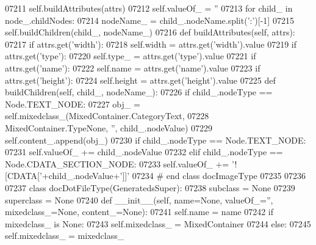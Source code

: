 \begin{DoxyCode}
{{{{{{{{{{{{{{{{{{{{{{{{{{{{{{{{{{{{{{{{{{{{{{{{{{{{{{{{{{{{{{{{{{{{{{{{{{{{{{{{{{{{{{{{{{{{{{{{{{{{{{{{{{{{{{{{{{{{{{{{{{{{{{{{{{{{{{{{{{{{{{{{{{{{{{{{{{{{{{{{{{{{{{{{{{{{{{{{{{{{{{{{{{{{{{{{{{{{{{{{{{{{{{{{{{{{{{{{{{{{{{{{{{{{{{{{{{{{{{{{{{{{{{{{{{{{{{{{{{{{{{{{{{{{{{{{{{{{{{{{{{{{{{{{{{{{{{{{{{{{{{{{{{{{{{{{{{{{{{{{{{{{{{{{{{{{{{{{{{{{{{{{{{{{{{{{{{{{{{{{{{{{{{{{{{{{{{{{{{{{{{{{{{{{{{{{{{{{{{{{{{{{{{{{{{{{{{{{{{{{{{{{{{{{{{{{{{{{{{{{{{{{{{{{{{{{{{07211         self.buildAttributes(attrs)
07212         self.valueOf_ = \textcolor{stringliteral}{''}
07213         \textcolor{keywordflow}{for} child\_ \textcolor{keywordflow}{in} node\_.childNodes:
07214             nodeName\_ = child\_.nodeName.split(\textcolor{stringliteral}{':'})[-1]
07215             self.buildChildren(child\_, nodeName\_)
07216     \textcolor{keyword}{def }buildAttributes(self, attrs):
07217         \textcolor{keywordflow}{if} attrs.get(\textcolor{stringliteral}{'width'}):
07218             self.width = attrs.get(\textcolor{stringliteral}{'width'}).value
07219         \textcolor{keywordflow}{if} attrs.get(\textcolor{stringliteral}{'type'}):
07220             self.type_ = attrs.get(\textcolor{stringliteral}{'type'}).value
07221         \textcolor{keywordflow}{if} attrs.get(\textcolor{stringliteral}{'name'}):
07222             self.name = attrs.get(\textcolor{stringliteral}{'name'}).value
07223         \textcolor{keywordflow}{if} attrs.get(\textcolor{stringliteral}{'height'}):
07224             self.height = attrs.get(\textcolor{stringliteral}{'height'}).value
07225     \textcolor{keyword}{def }buildChildren(self, child\_, nodeName\_):
07226         \textcolor{keywordflow}{if} child\_.nodeType == Node.TEXT\_NODE:
07227             obj\_ = self.mixedclass_(MixedContainer.CategoryText,
07228                 MixedContainer.TypeNone, \textcolor{stringliteral}{''}, child\_.nodeValue)
07229             self.content\_.append(obj\_)
07230         \textcolor{keywordflow}{if} child\_.nodeType == Node.TEXT\_NODE:
07231             self.valueOf_ += child\_.nodeValue
07232         \textcolor{keywordflow}{elif} child\_.nodeType == Node.CDATA\_SECTION\_NODE:
07233             self.valueOf_ += \textcolor{stringliteral}{'![CDATA['}+child\_.nodeValue+\textcolor{stringliteral}{']]'}
07234 \textcolor{comment}{# end class docImageType}
07235 
07236 
07237 \textcolor{keyword}{class }docDotFileType(GeneratedsSuper):
07238     subclass = \textcolor{keywordtype}{None}
07239     superclass = \textcolor{keywordtype}{None}
07240     \textcolor{keyword}{def }__init__(self, name=None, valueOf\_='', mixedclass\_=None, content\_=None):
07241         self.name = name
07242         \textcolor{keywordflow}{if} mixedclass\_ \textcolor{keywordflow}{is} \textcolor{keywordtype}{None}:
07243             self.mixedclass_ = MixedContainer
07244         \textcolor{keywordflow}{else}:
07245             self.mixedclass_ = mixedclass\_
}}}}}}}}}}}}}}}}}}}}}}}}}}}}}}}}}}}}}}}}}}}}}}}}}}}}}}}}}}}}}}}}}}}}}}}}}}}}}}}}}}}}}}}}}}}}}}}}}}}}}}}}}}}}}}}}}}}}}}}}}}}}}}}}}}}}}}}}}}}}}}}}}}}}}}}}}}}}}}}}}}}}}}}}}}}}}}}}}}}}}}}}}}}}}}}}}}}}}}}}}}}}}}}}}}}}}}}}}}}}}}}}}}}}}}}}}}}}}}}}}}}}}}}}}}}}}}}}}}}}}}}}}}}}}}}}}}}}}}}}}}}}}}}}}}}}}}}}}}}}}}}}}}}}}}}}}}}}}}}}}}}}}}}}}}}}}}}}}}}}}}}}}}}}}}}}}}}}}}}}}}}}}}}}}}}}}}}}}}}}}}}}}}}}}}}}}}}}}}}}}}}}}}}}}}}}}}}}}}}}}}}}}}}}}}}}}}}}}}}}}}}}}}}}}}}}}}
\end{DoxyCode}
